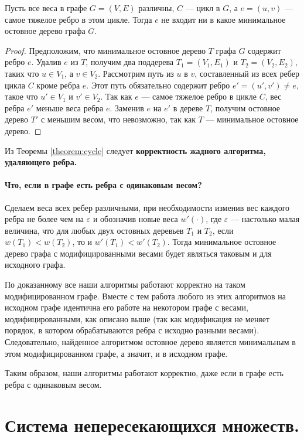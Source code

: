 \documentclass[a4paper,12pt]{article}
\begin{document}
	\begin{theorem}\label{theorem:cycle}%
	Пусть все веса в графе $G = (V, E)$ различны, $C$ --- цикл в $G$, а $e = (u, v)$ --- самое тяжелое ребро в этом цикле. Тогда $e$ не входит ни в какое минимальное остовное дерево графа $G$.
	\end{theorem}
	\begin{proof}
		Предположим, что минимальное остовное дерево $T$ графа $G$ содержит ребро $e$. Удалив $e$ из $T$, получим два поддерева $T_1 = (V_1, E_1)$ и $T_2 = (V_2, E_2)$, таких что $u \in V_1$, а $v \in V_2$. Рассмотрим путь из $u$ в $v$, составленный из всех ребер цикла $C$ кроме ребра $e$. Этот путь обязательно содержит ребро $e' = (u', v') \neq e$, такое что $u' \in V_1$ и $v' \in V_2$. Так как $e$ --- самое тяжелое ребро в цикле $C$, вес ребра $e'$ меньше веса ребра $e$. Заменив $e$ на $e'$ в дереве $T$, получим остовное дерево $T'$ с меньшим весом, что невозможно, так как $T$ --- минимальное остовное дерево.
	\end{proof}

Из Теоремы \ref{theorem:cycle} следует \textbf{корректность жадного алгоритма, удаляющего ребра.}

\paragraph{Что, если в графе есть ребра с одинаковым весом?} Сделаем веса всех ребер различными, при необходимости изменив вес каждого ребра не более чем на $\varepsilon$ и обозначив новые веса $w'(\cdot)$, где $\varepsilon$ --- настолько малая величина, что для любых двух остовных деревьев $T_1$ и $T_2$, если $w(T_1) < w(T_2)$, то и $w'(T_1) < w'(T_2)$. Тогда минимальное остовное дерево графа с модифицированными весами будет являться таковым и для исходного графа.

По доказанному все наши алгоритмы работают корректно на таком модифицированном графе. Вместе с тем работа любого из этих алгоритмов на исходном графе идентична его работе на некотором графе с весами, модифицированными, как описано выше (так как модификация не меняет порядок, в котором обрабатываются ребра с исходно разными весами). Следовательно, найденное алгоритмом остовное дерево является минимальным в этом модифицированном графе, а значит, и в исходном графе.

Таким образом, наши алгоритмы работают корректно, даже если в графе есть ребра с одинаковым весом.
 
\newpage
\section{Система непересекающихся множеств.}
\end{document}
